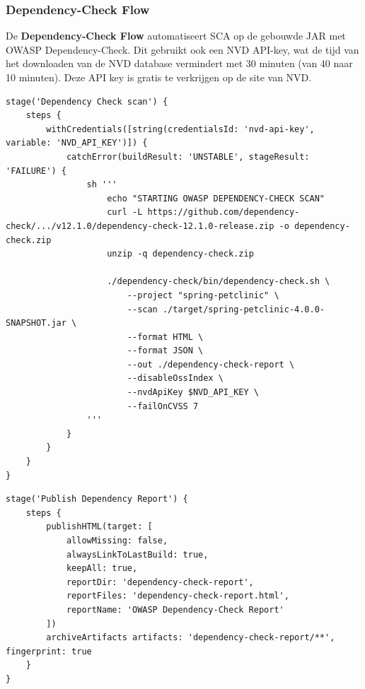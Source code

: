\subsubsection{Dependency-Check Flow}
De \textbf{Dependency-Check Flow} automatiseert SCA op de gebouwde JAR met OWASP Dependency-Check. Dit gebruikt ook een NVD API-key, wat de tijd van het downloaden van de NVD database vermindert met 30 minuten (van 40 naar 10 minuten). Deze API key is gratis te verkrijgen op de site van NVD.
\begin{listing}[H]
    \caption{Dependency-Check scan-stage in Jenkins pipeline}
    \label{lst:dependency-check-scan}
    \begin{verbatim}
stage('Dependency Check scan') {
    steps {
        withCredentials([string(credentialsId: 'nvd-api-key', variable: 'NVD_API_KEY')]) {
            catchError(buildResult: 'UNSTABLE', stageResult: 'FAILURE') {
                sh '''
                    echo "STARTING OWASP DEPENDENCY-CHECK SCAN"
                    curl -L https://github.com/dependency-check/.../v12.1.0/dependency-check-12.1.0-release.zip -o dependency-check.zip
                    unzip -q dependency-check.zip

                    ./dependency-check/bin/dependency-check.sh \
                        --project "spring-petclinic" \
                        --scan ./target/spring-petclinic-4.0.0-SNAPSHOT.jar \
                        --format HTML \
                        --format JSON \
                        --out ./dependency-check-report \
                        --disableOssIndex \
                        --nvdApiKey $NVD_API_KEY \
                        --failOnCVSS 7
                '''
            }
        }
    }
}
    \end{verbatim}
\end{listing}

\begin{listing}[H]
    \caption{Publish Dependency Report-stage in Jenkins pipeline}
    \label{lst:dependency-check-publish}
    \begin{verbatim}
stage('Publish Dependency Report') {
    steps {
        publishHTML(target: [
            allowMissing: false,
            alwaysLinkToLastBuild: true,
            keepAll: true,
            reportDir: 'dependency-check-report',
            reportFiles: 'dependency-check-report.html',
            reportName: 'OWASP Dependency-Check Report'
        ])
        archiveArtifacts artifacts: 'dependency-check-report/**', fingerprint: true
    }
}
    \end{verbatim}
\end{listing}

